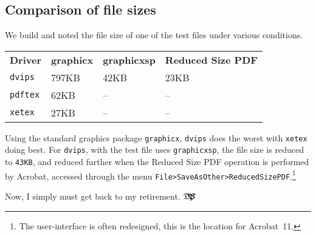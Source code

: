 \documentclass{article}
\def\dps{$\hbox{$\mathfrak D$\kern-.3em\hbox{$\mathfrak P$}%
   \kern-.6em \hbox{$\mathcal S$}}$}
\let\amtIndent\leftmargini
\begin{document}
\subsection{Comparison of file sizes}

We build and noted the file size of one of the test files under various
conditions.
\begin{flushleft}
\hspace*{\amtIndent}\begin{tabular}{llll}
\textbf{Driver}&\textbf{graphicx}&\textbf{graphicxsp}&\textbf{Reduced Size PDF}\\
\texttt{dvips}&797KB&42KB&23KB\\
\texttt{pdftex}&62KB&--&--\\
\texttt{xetex}&27KB&--&--
\end{tabular}
\end{flushleft}
Using the standard graphics package \texttt{graphicx}, \texttt{dvips} does
the worst with \texttt{xetex} doing best. For \texttt{dvips}, with the
test file uses \texttt{graphicxsp}, the file size is reduced to
\texttt{43KB}, and reduced further when the Reduced Size PDF operation is
performed by Acrobat, accessed through the menu
\texttt{File\;>\;Save\;As\;Other\;>\;Reduced\;Size\;PDF}.\footnote{The user-interface is often redesigned, this is the location
for Acrobat~11.}



\newtopic\noindent
Now, I simply must get back to my retirement. \dps
\end{document}
